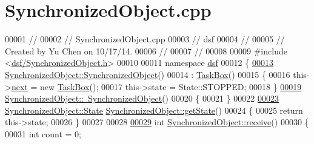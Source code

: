 \hypertarget{_synchronized_object_8cpp_source}{}\section{Synchronized\+Object.\+cpp}
\label{_synchronized_object_8cpp_source}

\begin{DoxyCode}
00001 \textcolor{comment}{//}
00002 \textcolor{comment}{//  SynchronizedObject.cpp}
00003 \textcolor{comment}{//  dsf}
00004 \textcolor{comment}{//}
00005 \textcolor{comment}{//  Created by Yu Chen on 10/17/14.}
00006 \textcolor{comment}{//}
00007 \textcolor{comment}{//}
00008 
00009 \textcolor{preprocessor}{#include <\hyperlink{_synchronized_object_8h}{dsf/SynchronizedObject.h}>}
00010 
00011 \textcolor{keyword}{namespace }\hyperlink{namespacedsf}{dsf}
00012 \{
\hypertarget{_synchronized_object_8cpp_source_l00013}{}\hyperlink{classdsf_1_1_synchronized_object_a3f1d2def677e6d814de4d0bd2aa3d95b}{00013}     \hyperlink{classdsf_1_1_synchronized_object_a3f1d2def677e6d814de4d0bd2aa3d95b}{SynchronizedObject::SynchronizedObject}()
00014         : \hyperlink{classdsf_1_1_task_box}{TaskBox}()
00015     \{
00016         this->\hyperlink{classdsf_1_1_synchronisable_ae2434faac15d3184da1543a91e175713}{next} = \textcolor{keyword}{new} \hyperlink{classdsf_1_1_task_box_a931c925e0a4956ee6bc1674f43ecc0a0}{TaskBox}();
00017         this->state = State::STOPPED;
00018     \}
\hypertarget{_synchronized_object_8cpp_source_l00019}{}\hyperlink{classdsf_1_1_synchronized_object_a0181452530628f24baad25eea03580f9}{00019}     \hyperlink{classdsf_1_1_synchronized_object_a0181452530628f24baad25eea03580f9}{SynchronizedObject::~SynchronizedObject}()
00020     \{
00021     \}
00022     
\hypertarget{_synchronized_object_8cpp_source_l00023}{}\hyperlink{classdsf_1_1_synchronized_object_a9fbf045eff345188935402ae576933eb}{00023}     \hyperlink{classdsf_1_1_runnable_a8eb63b21a0accc7a6a2a05f18e257991}{SynchronizedObject::State} 
      \hyperlink{classdsf_1_1_synchronized_object_a9fbf045eff345188935402ae576933eb}{SynchronizedObject::getState}()
00024     \{
00025         \textcolor{keywordflow}{return} this->state;
00026     \}
00027 
00028     
\hypertarget{_synchronized_object_8cpp_source_l00029}{}\hyperlink{classdsf_1_1_synchronized_object_a3ce496c6aaecc4b0ca3a4d09539a4920}{00029}     \textcolor{keywordtype}{int} \hyperlink{classdsf_1_1_synchronized_object_a3ce496c6aaecc4b0ca3a4d09539a4920}{SynchronizedObject::receive}()
00030     \{
00031         \textcolor{keywordtype}{int} count = 0;

\end{DoxyCode}
